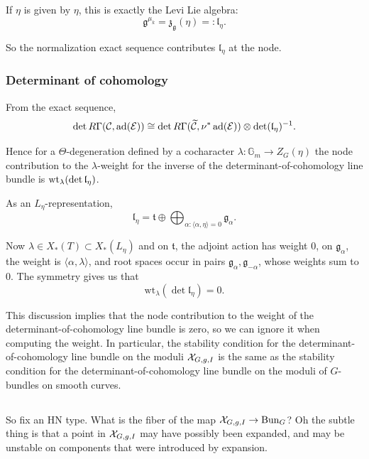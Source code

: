 \documentclass[12pt]{article}
\begin{document}
If \(\eta\) is given by \(\eta\), this is exactly the Levi Lie algebra:
\[
\mathfrak{g}^{\mu_k}=\mathfrak{z}_{\mathfrak{g}}(\eta)=:\mathfrak{l}_\eta.
\]

So the normalization exact sequence contributes
\(\mathfrak{l}_\eta\)
at the node.

\subsubsection{Determinant of cohomology}

From the exact sequence,
\[
\det R\Gamma(\mathcal{C},\operatorname{ad}(\mathcal{E}))
\cong
\det R\Gamma(\widetilde{\mathcal{C}},\nu^*\operatorname{ad}(\mathcal{E}))
\otimes
\det(\mathfrak{l}_\eta)^{-1}.
\]

Hence for a \(\Theta\)-degeneration defined by a cocharacter $\lambda:\mathbb{G}_m\to Z_G(\eta)$
the node contribution to the \(\lambda\)-weight for the inverse of the determinant-of-cohomology line bundle is $\operatorname{wt}_\lambda(\det \mathfrak{l}_\eta)$.

As an \(L_\eta\)-representation,
\[
\mathfrak{l}_\eta
=
\mathfrak{t}
\oplus
\bigoplus_{\alpha:\langle \alpha,\eta\rangle=0}\mathfrak{g}_\alpha.
\]

Now \(\lambda \in X_*(T) \subset X_*(L_\eta)\) and on \(\mathfrak{t}\), the adjoint action has weight 0, on \(\mathfrak{g}_\alpha\), the weight is \(\langle \alpha,\lambda\rangle\), and root spaces occur in pairs \(\mathfrak{g}_\alpha,\mathfrak{g}_{-\alpha}\), whose weights sum to 0. The symmetry gives us that
\[
\mathrm{wt}_\lambda(\det \mathfrak{l}_\eta)=0.
\]

This discussion implies that the node contribution to the weight of the determinant-of-cohomology line bundle is zero, so we can ignore it when computing the weight. In particular, the stability condition for the determinant-of-cohomology line bundle on the moduli ${\mathcal{X}}_{G,g,I}$ is the same as the stability condition for the determinant-of-cohomology line bundle on the moduli of $G$-bundles on smooth curves.

\subsection{}
So fix an HN type. What is the fiber of the map ${\mathcal{X}}_{G,g,I} \to \operatorname{Bun}_G$? Oh the subtle thing is that a point in ${\mathcal{X}}_{G,g,I}$ may have possibly been expanded, and may be unstable on components that were introduced by expansion. 
\end{document}
